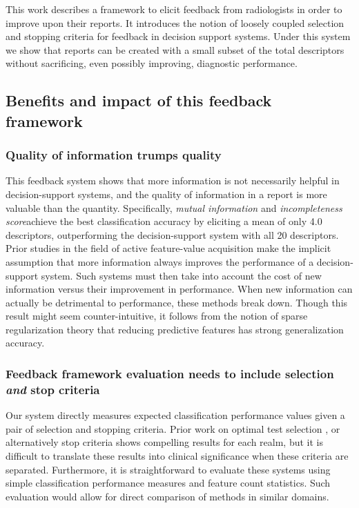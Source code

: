 This work describes a framework to elicit feedback from radiologists in order to improve upon their reports.
It introduces the notion of loosely coupled selection and stopping criteria for feedback in decision support systems.
Under this system we show that reports can be created with a small subset of the total descriptors without sacrificing, even possibly improving, diagnostic performance.

\subsection{Benefits and impact of this feedback framework}

\subsubsection{Quality of information trumps quality}
This feedback system shows that more information is not necessarily helpful in decision-support systems, and the quality of information in a report is more valuable than the quantity.
Specifically, \emph{mutual information} and \emph{incompleteness score}achieve the best classification accuracy by eliciting a mean of only 4.0 descriptors, outperforming the decision-support system with all 20 descriptors.
Prior studies in the field of active feature-value acquisition make the implicit assumption that more information always improves the performance of a decision-support system.
Such systems must then take into account the cost of new information versus their improvement in performance.
When new information can actually be detrimental to performance, these methods break down.
Though this result might seem counter-intuitive, it follows from the notion of sparse regularization theory that reducing predictive features has strong generalization accuracy.


\subsubsection{Feedback framework evaluation needs to include selection \emph{and} stop criteria}
Our system directly measures expected classification performance values given a pair of selection and stopping criteria. Prior work on  optimal test selection \cite{Greiner:2002wr,Madigan:1996cv, Krause:2005tr}, or alternatively stop criteria \cite{Gaag:2011gs} shows compelling results for each realm, but it is difficult to translate these results into clinical significance when these criteria are separated. Furthermore, it is straightforward to evaluate these systems using simple classification performance measures and feature count statistics. Such evaluation would allow for direct comparison of methods in similar domains.


